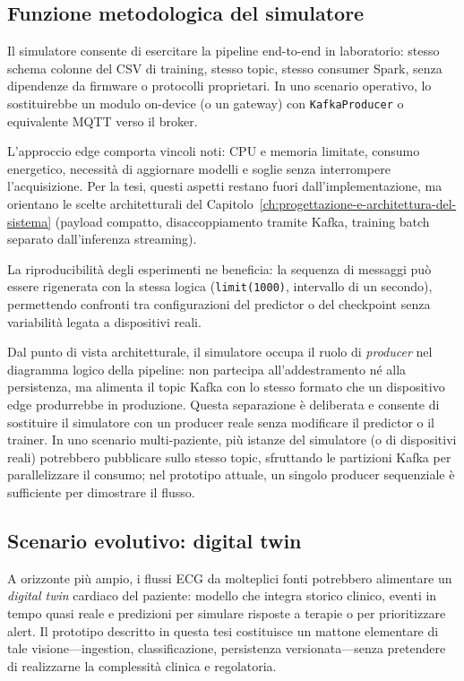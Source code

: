\subsection{Funzione metodologica del simulatore}

Il simulatore consente di esercitare la pipeline end-to-end in laboratorio: stesso schema colonne del CSV di training, stesso topic, stesso consumer Spark, senza dipendenze da firmware o protocolli proprietari.
In uno scenario operativo, lo sostituirebbe un modulo on-device (o un gateway) con \texttt{KafkaProducer} o equivalente MQTT verso il broker.

L'approccio edge comporta vincoli noti: CPU e memoria limitate, consumo energetico, necessità di aggiornare modelli e soglie senza interrompere l'acquisizione.
Per la tesi, questi aspetti restano fuori dall'implementazione, ma orientano le scelte architetturali del Capitolo~\ref{ch:progettazione-e-architettura-del-sistema} (payload compatto, disaccoppiamento tramite Kafka, training batch separato dall'inferenza streaming).

La riproducibilità degli esperimenti ne beneficia: la sequenza di messaggi può essere rigenerata con la stessa logica (\texttt{limit(1000)}, intervallo di un secondo), permettendo confronti tra configurazioni del predictor o del checkpoint senza variabilità legata a dispositivi reali.

Dal punto di vista architetturale, il simulatore occupa il ruolo di \emph{producer} nel diagramma logico della pipeline: non partecipa all'addestramento né alla persistenza, ma alimenta il topic Kafka con lo stesso formato che un dispositivo edge produrrebbe in produzione.
Questa separazione è deliberata e consente di sostituire il simulatore con un producer reale senza modificare il predictor o il trainer.
In uno scenario multi-paziente, più istanze del simulatore (o di dispositivi reali) potrebbero pubblicare sullo stesso topic, sfruttando le partizioni Kafka per parallelizzare il consumo; nel prototipo attuale, un singolo producer sequenziale è sufficiente per dimostrare il flusso.

\subsection{Scenario evolutivo: digital twin}

A orizzonte più ampio, i flussi ECG da molteplici fonti potrebbero alimentare un \emph{digital twin} cardiaco del paziente: modello che integra storico clinico, eventi in tempo quasi reale e predizioni per simulare risposte a terapie o per prioritizzare alert.
Il prototipo descritto in questa tesi costituisce un mattone elementare di tale visione---ingestion, classificazione, persistenza versionata---senza pretendere di realizzarne la complessità clinica e regolatoria.

